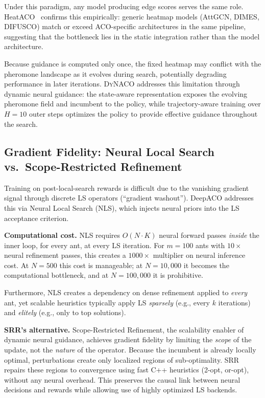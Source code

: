 \documentclass[sigconf,review]{acmart}
\newcommand{\DyNACO}{\textsc{DyNACO}}
\begin{document}
Under this paradigm, any model producing edge scores serves the same role.
HeatACO~\cite{heataco} confirms this empirically: generic heatmap models (AttGCN, DIMES, DIFUSCO) match or exceed ACO-specific architectures in the same pipeline, suggesting that the bottleneck lies in the static integration rather than the model architecture.

Because guidance is computed only once, the fixed heatmap may conflict with the pheromone landscape as it evolves during search, potentially degrading performance in later iterations.
\DyNACO{} addresses this limitation through dynamic neural guidance: the state-aware representation exposes the evolving pheromone field and incumbent to the policy, while trajectory-aware training over $H{=}10$ outer steps optimizes the policy to provide effective guidance throughout the search.

\subsection{Gradient Fidelity: Neural Local Search vs.\ Scope-Restricted Refinement}
\label{app:nls-analysis}

Training on post-local-search rewards is difficult due to the vanishing gradient signal through discrete LS operators (``gradient washout'').
DeepACO addresses this via Neural Local Search (NLS), which injects neural priors into the LS acceptance criterion.

\textbf{Computational cost.}
NLS requires $O(N \cdot K)$ neural forward passes \emph{inside} the inner loop, for every ant, at every LS iteration.
For $m{=}100$ ants with $10{\times}$ neural refinement passes, this creates a $1000{\times}$ multiplier on neural inference cost.
At $N{=}500$ this cost is manageable; at $N{=}10{,}000$ it becomes the computational bottleneck, and at $N{=}100{,}000$ it is prohibitive.

Furthermore, NLS creates a dependency on dense refinement applied to \emph{every} ant, yet scalable heuristics typically apply LS \emph{sparsely} (e.g., every $k$ iterations) and \emph{elitely} (e.g., only to top solutions).

\textbf{SRR's alternative.}
Scope-Restricted Refinement, the scalability enabler of dynamic neural guidance, achieves gradient fidelity by limiting the \emph{scope} of the update, not the \emph{nature} of the operator.
Because the incumbent is already locally optimal, perturbations create only localized regions of sub-optimality.
SRR repairs these regions to convergence using fast C++ heuristics (2-opt, or-opt), without any neural overhead.
This preserves the causal link between neural decisions and rewards while allowing use of highly optimized LS backends.
\end{document}
